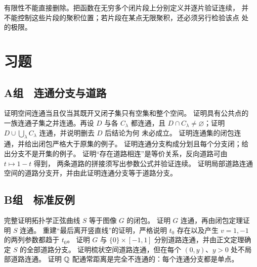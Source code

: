 有限性不能直接删除。把函数在无穷多个闭片段上分别定义并逐片验证连续，
并不能控制这些片段的聚积位置；若片段在某点无限聚积，还必须另行检验该点
处的极限。

\section*{习题}

\subsection*{A组　连通分支与道路}
\begin{enumerate}[label=\textbf{\thechapter.\arabic*.}]
 证明空间连通当且仅当其既开又闭子集只有空集和整个空间。
 证明具有公共点的一族连通子集之并连通。再设 \(D\) 与各
 \(C_\lambda\) 都连通，且 \(D\cap C_\lambda\ne\varnothing\)；证明
 \(D\cup\bigcup_\lambda C_\lambda\) 连通，并说明删去 \(D\) 后结论为何
 未必成立。
 证明连通集的闭包连通，并给出闭包严格大于原集的例子。
 证明连通分支构成分划且每个分支闭；给出分支不是开集的例子。
 证明“存在道路相连”是等价关系，反向道路可由 \(t\mapsto1-t\) 得到，
 两条道路的拼接须写出参数公式并验证连续。
 证明局部道路连通空间的道路分支开，并由此证明连通分支等于道路分支。
\end{enumerate}

\subsection*{B组　标准反例}
\begin{enumerate}[label=\textbf{\thechapter.\arabic*.},resume]
 完整证明拓扑学正弦曲线 \(S\) 等于图像 \(G\) 的闭包。
 证明 \(G\) 连通，再由闭包定理证明 \(S\) 连通。
 重建“最后离开竖直线”的证明，严格说明 \(t_0\) 存在以及产生
 \(v=1,-1\) 的两列参数都趋于 \(t_0\)。
 证明 \(G\) 与 \(\{0\}\times[-1,1]\) 分别道路连通，并由正文定理确定
 \(S\) 的全部道路分支。
 证明梳状空间道路连通，但在每个 \((0,y)\)、\(y>0\) 处不局部道路连通。
 证明 \(\mathbb{Q}\) 配通常距离是完全不连通的：每个连通分支都是单点。
\end{enumerate}

